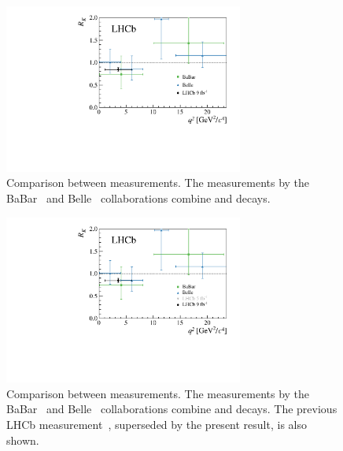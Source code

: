 \begin{figure}[!h]
    \centering
    \includegraphics[width=0.7\textwidth]{figures/FigS3.pdf}
    \caption{Comparison between \RK measurements. 
    The measurements by the BaBar~\cite{RKbabar} and Belle~\cite{RKbelle} collaborations combine \BuKll and \BdKSll decays.}
    \label{fig:RKresultVSq2}
\end{figure}

\begin{figure}[!h]
    \centering
    \includegraphics[width=0.7\textwidth]{figures/FigS4.pdf}
    \caption{Comparison between \RK measurements. 
    The measurements by the BaBar~\cite{RKbabar} and Belle~\cite{RKbelle} collaborations combine \BuKll and \BdKSll decays. The previous LHCb measurement~\cite{LHCb-PAPER-2019-009}, superseded by the present result, is also shown.
    \label{fig:RKresultVSq2Old}}
\end{figure}

